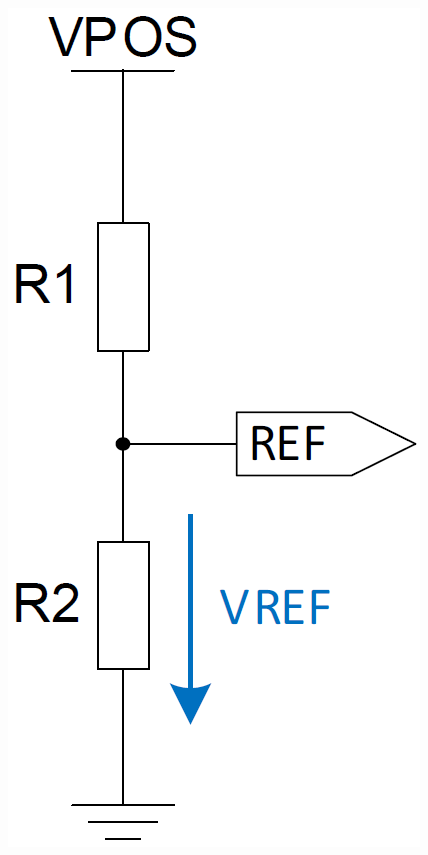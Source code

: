 \begin{minipage}[c]{0.2\columnwidth}
    \includegraphics[width=\columnwidth]{images/spannungsteiler.png}
\end{minipage}
\hfill
